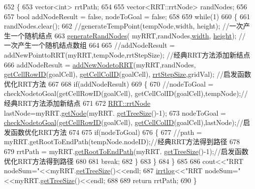 \begin{DoxyCode}
652 \{
653     vector<int>  rrtPath;
654 
655     vector<RRT::rrtNode> randNodes;
656 
657     \textcolor{keywordtype}{bool} addNodeResult = \textcolor{keyword}{false}, nodeToGoal = \textcolor{keyword}{false};
658 
659     \textcolor{keywordflow}{while}(1)
660     \{
661         randNodes.clear();
662         \textcolor{comment}{//generateTempPoint(tempNode,width, height);  //一次产生一个随机结点}
663         \hyperlink{classrrt__plan_1_1rrt__planner_ac34f8c3a590fb6f3ba04c99500a8abae}{generateRandNodes}( myRRT,randNodes,\hyperlink{classrrt__plan_1_1rrt__planner_ac74fe436b5e1fa30bda1fbe821369aa2}{width}, \hyperlink{classrrt__plan_1_1rrt__planner_a3549de56a50bff6494514878b64584df}{height});  \textcolor{comment}{//一次产生一个随机结点数组}
664 
665         \textcolor{comment}{//addNodeResult = addNewPointtoRRT(myRRT,tempNode,rrtStepSize);  //经典RRT方法添加新结点}
666         addNodeResult = \hyperlink{classrrt__plan_1_1rrt__planner_a22cb05cb13d3027310f3fcc2b394dda6}{addNewNodetoRRT}(myRRT,randNodes,
      \hyperlink{classrrt__plan_1_1rrt__planner_aa3c07d6b2b6bed62e4b60d3898fc80cf}{getCellRowID}(goalCell), \hyperlink{classrrt__plan_1_1rrt__planner_a758810b2f257fe0778ed3eb1e970d99c}{getCellColID}(goalCell),
      \hyperlink{rrt_8h_aaac2d108c57a5722b9d816baaed80945}{rrtStepSize},gridVal); \textcolor{comment}{//启发函数优化RRT方法}
667 
668         \textcolor{keywordflow}{if}(addNodeResult)
669         \{
670             \textcolor{comment}{//nodeToGoal = checkNodetoGoal(getCellRowID(goalCell),
       getCellColID(goalCell),tempNode);//经典RRT方法添加新结点}
671 
672             \hyperlink{structRRT_1_1rrtNode}{RRT::rrtNode} lastNode=myRRT.\hyperlink{classRRT_afde36442771a9552bb97572098396c2b}{getNode}(myRRT.
      \hyperlink{classRRT_a05dc852e0b777042e290dcc96bf605bb}{getTreeSize}()-1);
673             nodeToGoal = \hyperlink{classrrt__plan_1_1rrt__planner_a50e32f9cd1421d374ea1aab601433b10}{checkNodetoGoal}(\hyperlink{classrrt__plan_1_1rrt__planner_aa3c07d6b2b6bed62e4b60d3898fc80cf}{getCellRowID}(goalCell), 
      \hyperlink{classrrt__plan_1_1rrt__planner_a758810b2f257fe0778ed3eb1e970d99c}{getCellColID}(goalCell),lastNode);\textcolor{comment}{//启发函数优化RRT方法}
674 
675             \textcolor{keywordflow}{if}(nodeToGoal)
676             \{
677                 \textcolor{comment}{//path = myRRT.getRootToEndPath(tempNode.nodeID);//经典RRT方法得到路径}
678 
679                 rrtPath = myRRT.\hyperlink{classRRT_a487dc3036806a9fb506a718257d8a846}{getRootToEndPath}(myRRT.
      \hyperlink{classRRT_a05dc852e0b777042e290dcc96bf605bb}{getTreeSize}()-1);\textcolor{comment}{//启发函数优化RRT方法得到路径}
680 
681                 \textcolor{keywordflow}{break};
682             \}
683         \}
684     \}
685 
686     cout<<\textcolor{stringliteral}{"RRT nodeSum="}<<myRRT.\hyperlink{classRRT_a05dc852e0b777042e290dcc96bf605bb}{getTreeSize}()<<endl;
687     \hyperlink{rrt__planner_8cpp_ae63d6003ff9416f7c0be6892e5bb899c}{irrtlog}<<\textcolor{stringliteral}{"RRT nodeSum="}<<myRRT.\hyperlink{classRRT_a05dc852e0b777042e290dcc96bf605bb}{getTreeSize}()<<endl;
688 
689     \textcolor{keywordflow}{return} rrtPath;
690 \}
\end{DoxyCode}
